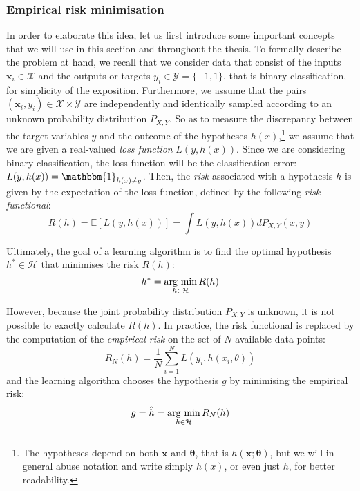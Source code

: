 {\subsubsection{Empirical risk minimisation}
In order to elaborate this idea, let us first introduce some important concepts that we will use in this section and throughout the thesis. To formally describe the problem at hand, we recall that we consider data that consist of the inputs $\mathbf{x}_{i} \in \mathcal{X}$ and the outputs or targets $y_{i} \in \mathcal{Y} = \{-1, 1\}$, that is binary classification, for simplicity of the exposition. Furthermore, we assume that the pairs $(\mathbf{x}_{i}, y_{i}) \in \mathcal{X} \times \mathcal{Y}$ are independently and identically sampled according to an unknown probability distribution $P_{X,Y}$. So as to measure the discrepancy between the target variables $y$ and the outcome of the hypotheses $h(x)$,\footnote{The hypotheses depend on both $\mathbf{x}$ and $\boldsymbol{\theta}$, that is $h(\mathbf{x}; \boldsymbol{\theta})$, but we will in general abuse notation and write simply $h(x)$, or even just $h$, for better readability.} we assume that we are given a real-valued \textit{loss function} $L(y, h(x))$. Since we are considering binary classification, the loss function will be the classification error: $L(y, h(x)) = \mathbbm{1}_{h(x) \neq y}$. Then, the \textit{risk} associated with a hypothesis $h$ is given by the expectation of the loss function, defined by the following \textit{risk functional}:
%
\begin{equation}
    R(h) = \mathbb{E} \left[ L(y, h(x)) \right] = \int L(y, h(x))dP_{X,Y}(x, y)
\end{equation}

Ultimately, the goal of a learning algorithm is to find the optimal hypothesis $h^{*} \in \mathcal{H}$ that minimises the risk $R(h)$:
%
\begin{equation}
    h^{*} = \argmin_{h \in \mathcal{H}} R(h)
\end{equation}

However, because the joint probability distribution $P_{X,Y}$ is unknown, it is not possible to exactly calculate $R(h)$. In practice, the risk functional is replaced by the computation of the \textit{empirical risk} on the set of $N$ available data points:
%
\begin{equation}
    R_{N}(h) = \frac{1}{N} \sum_{i=1}^{N} L(y_{i}, h(x_{i}, \theta))
\end{equation}
%
and the learning algorithm chooses the hypothesis $g$ by minimising the empirical risk:
%
\begin{equation}
    g = \hat{h} = \argmin_{h \in \mathcal{H}} R_{N}(h)
\end{equation}

}
